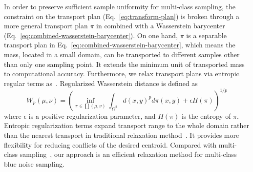 In order to preserve sufficient sample uniformity for multi-class sampling,
the constraint on the transport plan (Eq.~\ref{eq:transform-plan})
is broken through a more general transport plan $\pi$ in combined with a Wasserstein barycenter (Eq.~\ref{eq:combined-wasserstein-barycenter}).
On one hand,
$\pi$ is a separable transport plan in Eq.~\ref{eq:combined-wasserstein-barycenter},
which means the mass, located in a small domain, can be transported to different samples other than only one sampling point.
It extends the minimum unit of transported mass to computational accuracy.
Furthermore,
we relax transport plans via entropic regular terms as~\cite{cuturi:2013:sinkhorn}.
Regularized Wasserstein distance is defined as
\begin{equation}\label{eq:regulate-wasserstein-distance}
 W_p(\mu,\nu)=\left(\inf\limits_{\pi\in\prod(\mu,\nu)}\int_{\Omega^2}d(x,y)^pd\pi(x,y)+\epsilon H(\pi)\right )^{1/p}
\end{equation}
where $\epsilon$ is a positive regularization parameter,
and $H(\pi)$ is the entropy of $\pi$.
Entropic regularization terms expand transport range to the whole domain rather than the nearest transport in traditional relaxation method~\cite{balzer:2009:capacity}.
It provides more flexibility for reducing conflicts of the desired centroid.
Compared with multi-class sampling~\cite{wei:2010:multi},
our approach is an efficient relaxation method for multi-class blue noise sampling.






